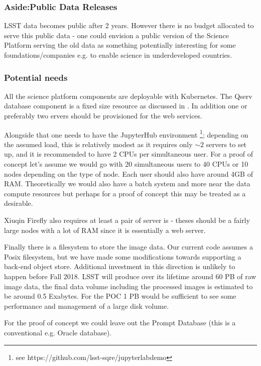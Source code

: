 \subsubsection {Aside:Public Data Releases}
LSST data becomes public after 2 years. However there is no budget allocated to serve this public data - one could envision a public version of the Science Platform serving the old data as something potentially interesting for some foundations/companies e.g. to enable science in underdeveloped countries.

\subsubsection {Potential needs}
All the science platform components are deployable with Kubernetes.   The Qserv database component is a fixed size resource as discussed in .
In addition one or preferably two ervers should be provisioned for the  web services.

Alongside that one needs to have the JupyterHub environment \footnote{see https://github.com/lsst-sqre/jupyterlabdemo}; depending on the assumed load, this is relatively modest as it requires only $\sim2$ servers to set up, and it is recommended to have 2 CPUs per simultaneous user. For a proof of concept let's assume we would go with 20 simultaneous users to 40 CPUs or 10 nodes depending on the type of node. Each user should also have around 4GB of RAM.
Theoretically we would also have a batch system and more near the data compute resources but perhaps for a proof of concept this may be treated as a desirable.

{\color{red} Xiuqin }
Firefly also requires at least a pair of  server is - theses should be a fairly large nodes with a lot of RAM since it is essentially a web server.

Finally there is a filesystem to store the image data. Our current code assumes a Posix filesystem, but we have made some modifications towards supporting a back-end object store. Additional investment in this direction is unlikely to happen before Fall 2018. LSST will produce over its lifetime around 60 PB of raw image data,  the final data volume including the processed images is estimated to be around 0.5 Exabytes.  For the POC 1 PB would be sufficient to see some performance and management of a large disk volume.

For the proof of concept we could leave out the Prompt Database (this is a conventional e.g. Oracle database).

